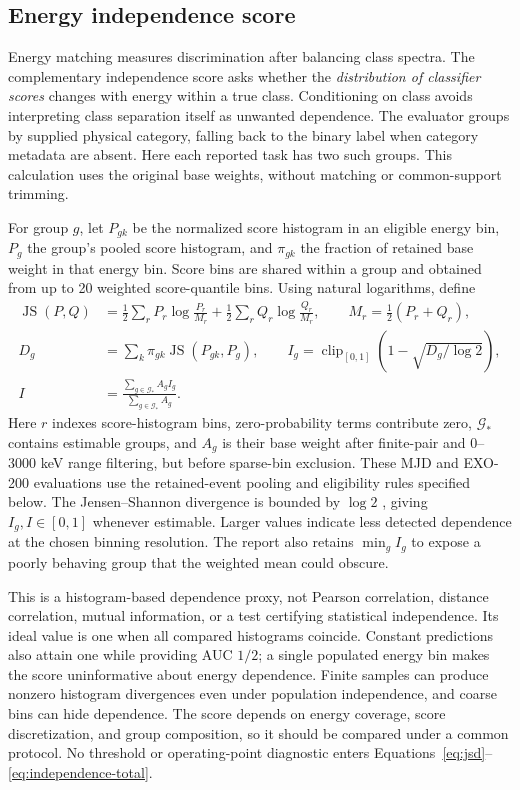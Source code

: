 \subsection{Energy independence score}
\label{sec:energy-independence}
Energy matching measures discrimination after balancing class spectra.
The complementary independence score asks whether the \emph{distribution
of classifier scores} changes with energy within a true class. Conditioning
on class avoids interpreting class separation itself as unwanted dependence.
The evaluator groups by supplied physical category, falling back to the binary
label when category metadata are absent. Here each reported task has two
such groups. This calculation uses the original base weights, without
matching or common-support trimming.

For group $g$, let $P_{gk}$ be the normalized score histogram in an eligible
energy bin, $P_g$ the group's pooled score histogram, and $\pi_{gk}$ the
fraction of retained base weight in that energy bin. Score bins are shared
within a group and obtained from up to 20 weighted score-quantile bins.
Using natural logarithms, define
\begin{align}
 \operatorname{JS}(P,Q)
 &=\tfrac12\sum_r P_r\log\frac{P_r}{M_r}
   +\tfrac12\sum_r Q_r\log\frac{Q_r}{M_r},
 \qquad M_r=\tfrac12(P_r+Q_r),
 \label{eq:jsd}\\
 D_g&=\sum_k\pi_{gk}\operatorname{JS}(P_{gk},P_g),\qquad
 I_g=\operatorname{clip}_{[0,1]}
       \left(1-\sqrt{D_g/\log 2}\right),
 \label{eq:independence-group}\\
 I&=\frac{\sum_{g\in\mathcal G_*} A_g I_g}
           {\sum_{g\in\mathcal G_*} A_g}.
 \label{eq:independence-total}
\end{align}
Here $r$ indexes score-histogram bins, zero-probability terms contribute
zero, $\mathcal G_*$ contains estimable groups, and $A_g$ is their base
weight after finite-pair and 0--3000 keV range filtering, but before
sparse-bin exclusion. These MJD and EXO-200 evaluations
use the retained-event pooling and eligibility rules specified below.
The Jensen--Shannon divergence is bounded by $\log 2$
\citep{lin1991divergence}, giving $I_g,I\in[0,1]$ whenever estimable.
Larger values indicate less detected dependence at the chosen binning
resolution. The report also retains $\min_g I_g$ to expose a poorly behaving
group that the weighted mean could obscure.

This is a histogram-based dependence proxy, not Pearson correlation,
distance correlation, mutual information, or a test certifying statistical
independence. Its ideal value is one when all compared histograms coincide.
Constant predictions also attain one while providing AUC $1/2$; a single
populated energy bin makes the score uninformative about energy dependence.
Finite samples can produce nonzero histogram divergences even under population
independence, and coarse bins can hide dependence. The score depends on energy
coverage, score discretization, and group composition, so it should be compared
under a common protocol. No threshold or operating-point diagnostic enters
Equations~\ref{eq:jsd}--\ref{eq:independence-total}.

